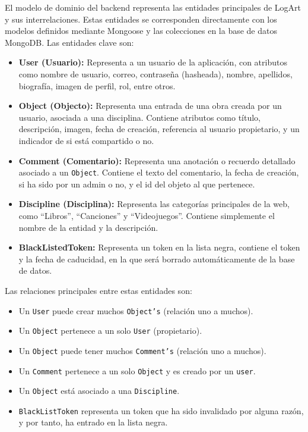 El modelo de dominio del backend representa las entidades principales de LogArt y sus interrelaciones. Estas entidades se corresponden directamente con los modelos definidos mediante Mongoose y las colecciones en la base de datos MongoDB. Las entidades clave son:
\begin{itemize}
    \item \textbf{User (Usuario):} Representa a un usuario de la aplicación, con atributos como nombre de usuario, correo, contraseña (hasheada), nombre, apellidos, biografía, imagen de perfil, rol, entre otros.
    \item \textbf{Object (Objecto):} Representa una entrada de una obra creada por un usuario, asociada a una disciplina. Contiene atributos como título, descripción, imagen, fecha de creación, referencia al usuario propietario, y un indicador de si está compartido o no.
    \item \textbf{Comment (Comentario):} Representa una anotación o recuerdo detallado asociado a un \texttt{Object}. Contiene el texto del comentario, la fecha de creación, si ha sido por un admin o no, y el id del objeto al que pertenece.
    \item \textbf{Discipline (Disciplina):} Representa las categorías principales de la web, como ``Libros'', ``Canciones'' y ``Videojuegos''. Contiene simplemente el nombre de la entidad y la descripción.
    \item \textbf{BlackListedToken:} Representa un token en la lista negra, contiene el token y la fecha de caducidad, en la que será borrado automáticamente de la base de datos.
\end{itemize}

Las relaciones principales entre estas entidades son:
\begin{itemize}
    \item Un \texttt{User} puede crear muchos \texttt{Object's} (relación uno a muchos).
    \item Un \texttt{Object} pertenece a un solo \texttt{User} (propietario).
    \item Un \texttt{Object} puede tener muchos \texttt{Comment's} (relación uno a muchos).
    \item Un \texttt{Comment} pertenece a un solo \texttt{Object} y es creado por un \texttt{user}.
    \item Un \texttt{Object} está asociado a una \texttt{Discipline}.
    \item \texttt{BlackListToken} representa un token que ha sido invalidado por alguna razón, y por tanto, ha entrado en la lista negra.
\end{itemize}

